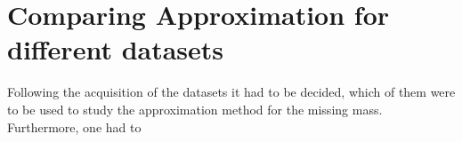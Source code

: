 \section{Comparing Approximation for different datasets}
Following the acquisition of the datasets it had to be decided, which of them were to be used to study the approximation method for the missing mass. Furthermore, one had to 
